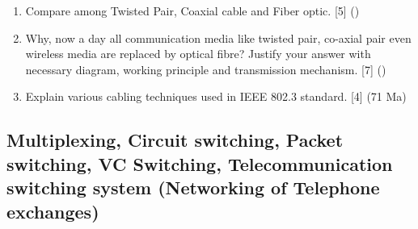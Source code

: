 \documentclass[12pt]{article}
\begin{document}
\begin{enumerate}[noitemsep, topsep=0pt]
	\item Compare among Twisted Pair, Coaxial cable and Fiber optic. \hfill [5] ()
	
	\item Why, now a day all communication media like twisted pair, co-axial pair even wireless media are replaced by optical fibre? Justify your answer with necessary diagram, working principle and transmission mechanism. \hfill [7] ()
	
	\item Explain various cabling techniques used in IEEE 802.3 standard. \hfill [4] (71 Ma)
\end{enumerate}

\subsection{Multiplexing, Circuit switching, Packet switching, VC Switching, Telecommunication switching system (Networking of Telephone exchanges)}
\end{document}
